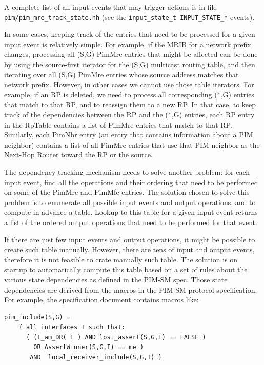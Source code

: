 \documentclass[11pt]{article}
\begin{document}
A complete list of all input events that may trigger actions is in file
\verb=pim/pim_mre_track_state.hh= (see the
\verb=input_state_t INPUT_STATE_*= events).

In some cases, keeping track of the entries that need to be processed
for a given input event is relatively simple. For example, if the MRIB
for a network prefix changes, processing all (S,G) PimMre entries that
might be affected can be done by using the source-first iterator for the
(S,G) multicast routing table, and then iterating over all (S,G) PimMre
entries whose source address matches that network prefix. However, in
other cases we cannot use those table iterators. For example, if an RP is
deleted, we need to process all corresponding (*,G) entries that match
to that RP, and to reassign them to a new RP. In that case, to keep track
of the dependencies between the RP and the (*,G) entries, each RP entry
in the RpTable contains a list of PimMre entries that match to that
RP. Similarly, each PimNbr entry (an entry that contains information
about a PIM neighbor) contains a list of all PimMre entries that use
that PIM neighbor as the Next-Hop Router toward the RP or the source.

The dependency tracking mechanism needs to solve another problem: for
each input event, find all the operations and their ordering that need
to be performed on some of the PimMre and PimMfc entries.  The solution
chosen to solve this problem is to enumerate all possible input events
and output operations, and to compute in advance a table. Lookup to this
table for a given input event returns a list of the ordered output
operations that need to be performed for that event.

If there are just few input events and output operations, it might be
possible to create such table manually. However, there are tens of input
and output events, therefore it is not feasible to crate manually such
table. The solution is on startup to automatically compute this table
based on a set of rules about the various state dependencies as defined
in the PIM-SM spec. Those state dependencies are derived from the macros
in the PIM-SM protocol specification. For example, the specification
document contains macros like:

\begin{verbatim}
pim_include(S,G) =
    { all interfaces I such that:
      ( (I_am_DR( I ) AND lost_assert(S,G,I) == FALSE )
        OR AssertWinner(S,G,I) == me )
       AND  local_receiver_include(S,G,I) }
\end{verbatim}
\end{document}
